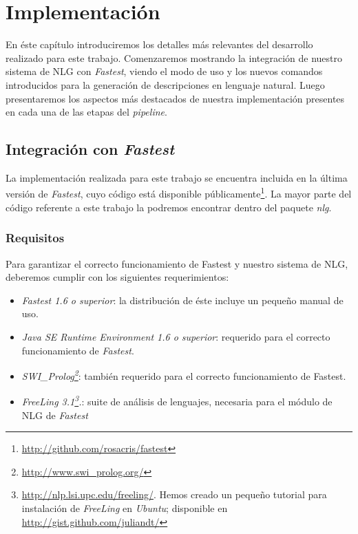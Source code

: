 \chapter{Implementación}
\label{cap:implementacion}

En éste capítulo introduciremos los detalles más relevantes del desarrollo realizado para este trabajo. Comenzaremos mostrando la integración de nuestro sistema de NLG con \textit{Fastest}, viendo el modo de uso y los nuevos comandos introducidos para la generación de descripciones en lenguaje natural. Luego presentaremos los aspectos más destacados de nuestra implementación presentes en cada una de las etapas del \emph{pipeline}.

\section{Integración con \emph{Fastest}}

La implementación realizada para este trabajo se encuentra incluida en la última versión de \emph{Fastest}, cuyo código está disponible públicamente\footnote{\url{http://github.com/rosacris/fastest}}. La mayor parte del código referente a este trabajo la podremos encontrar dentro del paquete \textit{nlg}.

\subsection*{Requisitos}

Para garantizar el correcto funcionamiento de Fastest y nuestro sistema de NLG, deberemos cumplir con los siguientes requerimientos:

\begin{itemize}
 \item  \emph{Fastest 1.6 o superior}: la distribución de éste incluye un pequeño manual de uso.
 \item  \emph{Java SE Runtime Environment 1.6 o superior}: requerido para el correcto funcionamiento de \emph{Fastest}.
 \item  \emph{SWI\_Prolog\footnote{\url{http://www.swi\_prolog.org/}}}: también requerido para el correcto funcionamiento de Fastest.
 \item  \emph{FreeLing 3.1\footnote{\url{http://nlp.lsi.upc.edu/freeling/}. Hemos creado un pequeño tutorial para instalación de \emph{FreeLing} en \emph{Ubuntu}; disponible en \url{http://gist.github.com/juliandt/}}.}: suite de análisis de lenguajes, necesaria para el módulo de NLG de \emph{Fastest}
\end{itemize}

